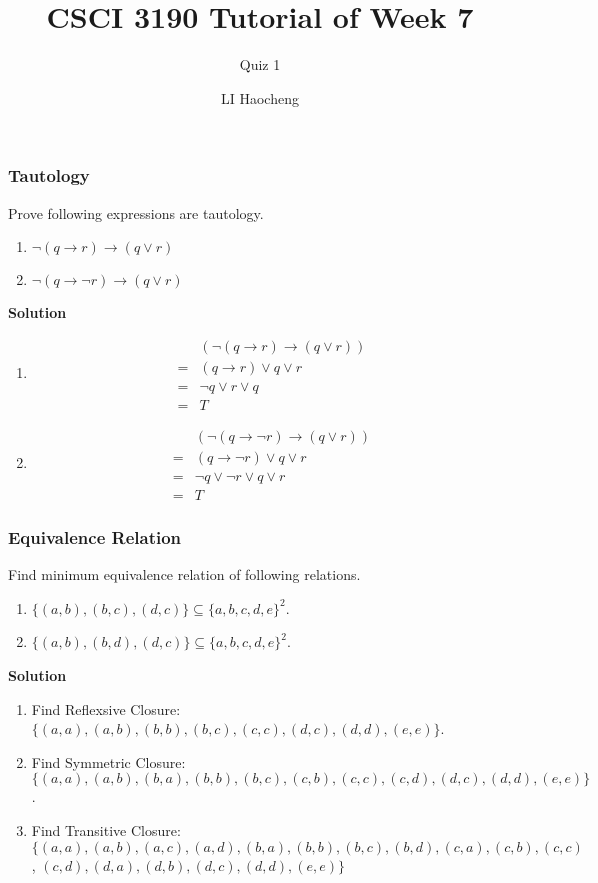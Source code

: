 \documentclass[10pt, compress]{beamer}
\title{CSCI 3190 Tutorial of Week 7}
\subtitle{Quiz 1}
\author{LI Haocheng}
\institute{Department of Computer Science and Engineering}
\begin{document}
\maketitle

\begin{frame}[fragile]
\frametitle{Tautology}
Prove following expressions are tautology.
\begin{enumerate}
	\item $\neg (q \rightarrow r) \rightarrow (q \vee r)$
	\item $\neg (q \rightarrow \neg r) \rightarrow (q \vee r)$
\end{enumerate}
\textbf{Solution}
\begin{multicols}{2}
\begin{enumerate}
	\item \begin{align}
	& (\neg (q \rightarrow r) \rightarrow (q \vee r))\\
	= & (q \rightarrow r) \vee q \vee r\\
	= & \neg q \vee r \vee q\\
	= & T
	\end{align}
	
	\columnbreak
	
	\item \begin{align}
	& (\neg (q \rightarrow \neg r) \rightarrow (q \vee r))\\
	= & (q \rightarrow \neg r) \vee q \vee r\\
	= & \neg q \vee \neg r \vee q \vee r\\
	= & T
	\end{align}
\end{enumerate}
\end{multicols}
\end{frame}

\begin{frame}[fragile]
\frametitle{Equivalence Relation}
Find minimum equivalence relation of following relations.
\begin{enumerate}
	\item $\{(a, b), (b, c), (d, c)\} \subseteq \{a, b, c, d, e\}^2$.
	\item $\{(a, b), (b, d), (d, c)\} \subseteq \{a, b, c, d, e\}^2$.
\end{enumerate}
\textbf{Solution}
\begin{enumerate}
	\item Find Reflexsive Closure: $\{(a, a), (a, b), (b, b), (b, c), (c, c), (d, c), (d, d), (e, e)\}$.
	\item Find Symmetric Closure: $\{(a, a), (a, b), (b, a), (b, b), (b, c), (c, b), (c, c), (c, d), (d, c), (d, d), (e, e)\}$.
	\item Find Transitive Closure: $\{(a, a), (a, b), (a, c), (a, d), (b, a), (b, b), (b, c), (b, d), (c, a), (c, b), (c, c)$, $(c, d), (d, a), (d, b), (d, c), (d, d), (e, e)\}$
\end{enumerate}
\end{frame}
\end{document}
